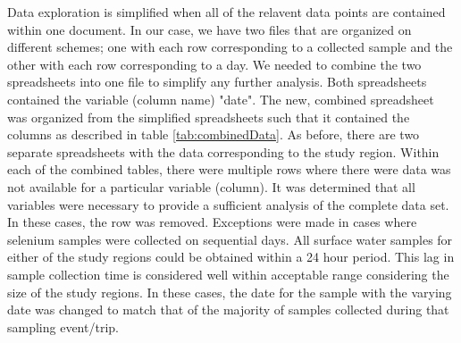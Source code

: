 Data exploration is simplified when all of the relavent data points are contained within one document.  In our case, we have two files that are organized on different schemes; one with each row corresponding to a collected sample and the other with each row corresponding to a day.  We needed to combine the two spreadsheets into one file to simplify any further analysis.  Both spreadsheets contained the variable (column name) "date".  The new, combined spreadsheet was organized from the simplified spreadsheets such that it contained the columns as described in table \ref{tab:combinedData}.  As before, there are two separate spreadsheets with the data corresponding to the study region.  Within each of the combined tables, there were multiple rows where there were data was not available for a particular variable (column).  It was determined that all variables were necessary to provide a sufficient analysis of the complete data set.  In these cases, the row was removed.  Exceptions were made in cases where selenium samples were collected on sequential days.  All surface water samples for either of the study regions could be obtained within a 24 hour period.  This lag in sample collection time is considered well within acceptable range considering the size of the study regions.  In these cases, the date for the sample with the varying date was changed to match that of the majority of samples collected during that sampling event/trip.

